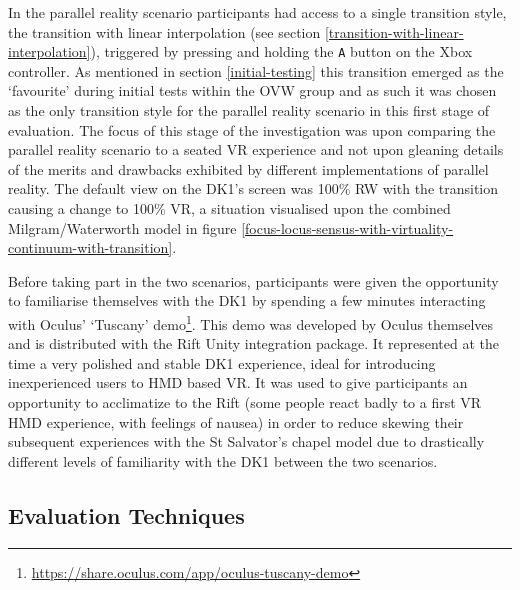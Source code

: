 In the parallel reality scenario participants had access to a single transition style, the transition with linear interpolation (see section \ref{transition-with-linear-interpolation}), triggered by pressing and holding the \texttt{A} button on the Xbox controller. As mentioned in section \ref{initial-testing} this transition emerged as the `favourite' during initial tests within the OVW group and as such it was chosen as the only transition style for the parallel reality scenario in this first stage of evaluation. The focus of this stage of the investigation was upon comparing the parallel reality scenario to a seated VR experience and not upon gleaning details of the merits and drawbacks exhibited by different implementations of parallel reality. The default view on the DK1's screen was 100\% RW with the transition causing a change to 100\% VR, a situation visualised upon the combined Milgram/Waterworth model in figure \ref{focus-locus-sensus-with-virtuality-continuum-with-transition}.

Before taking part in the two scenarios, participants were given the opportunity to familiarise themselves with the DK1 by spending a few minutes interacting with Oculus' `Tuscany' demo\footnote{\url{https://share.oculus.com/app/oculus-tuscany-demo}}. This demo was developed by Oculus themselves and is distributed with the Rift Unity integration package. It represented at the time a very polished and stable DK1 experience, ideal for introducing inexperienced users to HMD based VR. It was used to give participants an opportunity to acclimatize to the Rift (some people react badly to a first VR HMD experience, with feelings of nausea) in order to reduce skewing their subsequent experiences with the St Salvator's chapel model due to drastically different levels of familiarity with the DK1 between the two scenarios.


\subsection{Evaluation Techniques}

